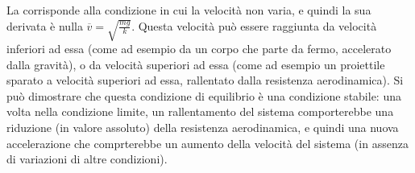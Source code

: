 \documentclass[letterpaper,10pt,italian]{jupyterBook}
\begin{document}
\sphinxAtStartPar
La  corrisponde alla condizione in cui la velocità non varia, e quindi la sua derivata è nulla \(\overline{v} = \sqrt{\frac{mg}{k}}\). Questa velocità può essere raggiunta da velocità inferiori ad essa (come ad esempio da un corpo che parte da fermo, accelerato dalla gravità), o da velocità superiori ad essa (come ad esempio un proiettile sparato a velocità superiori ad essa, rallentato dalla resistenza aerodinamica). Si può dimostrare  che questa condizione di equilibrio è una condizione stabile: una volta nella condizione limite, un rallentamento del sistema comporterebbe una riduzione (in valore assoluto) della resistenza aerodinamica, e quindi una nuova accelerazione che comprterebbe un aumento della velocità del sistema (in assenza di variazioni di altre condizioni).
\end{document}
